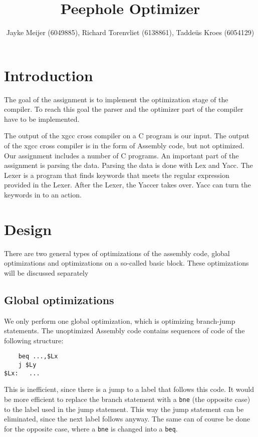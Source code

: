 \documentclass[10pt,a4paper]{article}
\title{Peephole Optimizer}
\author{Jayke Meijer (6049885), Richard Torenvliet (6138861), Tadde\"us Kroes
    (6054129)}
\begin{document}
\maketitle
\tableofcontents

\pagebreak

\section{Introduction}

The goal of the assignment is to implement the optimization stage of the
compiler. To reach this goal the parser and the optimizer part of the compiler
have to be implemented.

The output of the xgcc cross compiler on a C program is our input. The output
of the xgcc cross compiler is in the form of Assembly code, but not optimized.
Our assignment includes a number of C programs. An important part of the
assignment is parsing the data. Parsing the data is done with Lex and Yacc. The
Lexer is a program that finds keywords that meets the regular expression
provided in the Lexer. After the Lexer, the Yaccer takes over. Yacc can turn
the keywords in to an action.

\section{Design}

There are two general types of optimizations of the assembly code, global
optimizations and optimizations on a so-called basic block. These optimizations
will be discussed separately

\subsection{Global optimizations}

We only perform one global optimization, which is optimizing branch-jump
statements. The unoptimized Assembly code contains sequences of code of the
following structure:
\begin{verbatim}
    beq ...,$Lx
    j $Ly
$Lx:   ...
\end{verbatim}
This is inefficient, since there is a jump to a label that follows this code.
It would be more efficient to replace the branch statement with a \texttt{bne}
(the opposite case) to the label used in the jump statement. This way the jump
statement can be eliminated, since the next label follows anyway. The same can
of course be done for the opposite case, where a \texttt{bne} is changed into a
\texttt{beq}.
\end{document}
